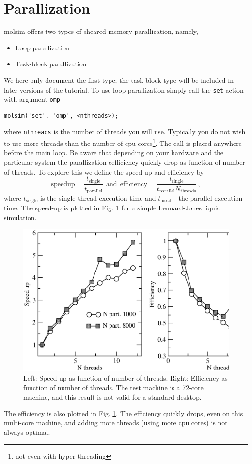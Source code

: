 \documentclass[11pt]{article}
\begin{document}
\section{Parallization}
\textsf{molsim} offers two types of sheared memory parallization, namely,
\begin{itemize}
\item Loop parallization 
\item Task-block parallization
\end{itemize}
We here only document the first type; the task-block type will be included in
later versions of the tutorial. To use loop parallization simply call
the \verb!set! action with argument \verb!omp!
\begin{verbatim}
molsim('set', 'omp', <nthreads>);
\end{verbatim}
where \verb!nthreads! is the number of threads you will use. Typically you do
not wish to use more threads than the number of cpu-cores\footnote{not even with
  hyper-threading}.  The call is placed anywhere before the main loop. Be aware
that depending on your hardware and the particular system the parallization
eefficiency quickly drop as function of number of threads. To explore this we
define the speed-up and efficiency by
\begin{equation}
  \mathrm{speedup} = \frac{t_\mathrm{single}}{t_\mathrm{parallel}} \ \
  \mathrm{and} \ \ 
  \mathrm{efficiency} = \frac{t_\mathrm{single}}{t_\mathrm{parallel}
    N_\mathrm{threads}}
  \, ,
\end{equation}
where $t_\mathrm{single}$ is the single thread execution time and
$t_\mathrm{parallel}$ the parallel execution time. The speed-up is plotted in
Fig. \ref{fig:bench} for a simple Lennard-Jones liquid simulation.
\begin{figure}[h]
  \begin{center}
    \includegraphics[scale=.4]{speedup.eps}
  \caption{
    \label{fig:bench}
    Left: Speed-up as function of number of threads. Right: Efficiency as
    function of number of threads. The test machine is a 72-core machine, and
    this result is not valid for a standard desktop.
  }
  \end{center}
\end{figure}
The efficiency is also plotted in Fig. \ref{fig:bench}. The efficiency quickly
drops, even on this multi-core machine, and adding more threads (using more cpu
cores) is not always optimal.
\end{document}
